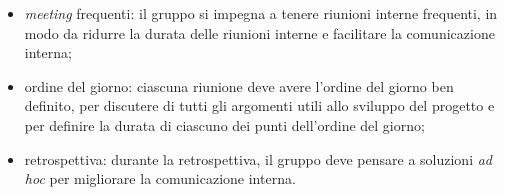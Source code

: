 \begin{itemize}
\begin{itemize}
		      \item \textit{meeting} frequenti: il gruppo si impegna a
		            tenere riunioni interne frequenti, in modo da ridurre la
		            durata delle riunioni interne e facilitare la comunicazione
		            interna;

		      \item ordine del giorno: ciascuna riunione deve avere l'ordine del
		            giorno ben definito, per discutere di tutti gli argomenti
		            utili allo sviluppo del progetto e per definire la durata di
		            ciascuno dei punti dell'ordine del giorno;

		      \item retrospettiva: durante la retrospettiva, il gruppo deve
		            pensare a soluzioni \textit{ad hoc} per migliorare la
		            comunicazione interna.
	      \end{itemize}
\end{itemize}
